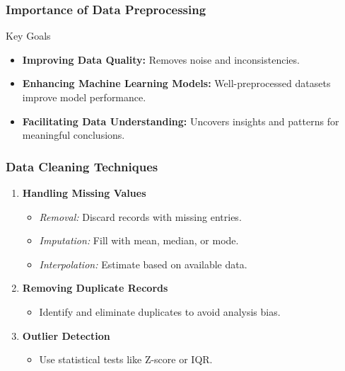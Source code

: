 \documentclass{beamer}
\begin{document}
\begin{frame}[fragile]
    \frametitle{Importance of Data Preprocessing}
    \begin{block}{Key Goals}
        \begin{itemize}
            \item \textbf{Improving Data Quality:} Removes noise and inconsistencies.
            \item \textbf{Enhancing Machine Learning Models:} Well-preprocessed datasets improve model performance.
            \item \textbf{Facilitating Data Understanding:} Uncovers insights and patterns for meaningful conclusions.
        \end{itemize}
    \end{block}
\end{frame}

\begin{frame}[fragile]
    \frametitle{Data Cleaning Techniques}
    \begin{enumerate}
        \item \textbf{Handling Missing Values}
            \begin{itemize}
                \item \textit{Removal:} Discard records with missing entries.
                \item \textit{Imputation:} Fill with mean, median, or mode.
                \item \textit{Interpolation:} Estimate based on available data.
            \end{itemize}
        \item \textbf{Removing Duplicate Records}
            \begin{itemize}
                \item Identify and eliminate duplicates to avoid analysis bias.
            \end{itemize}
        \item \textbf{Outlier Detection}
            \begin{itemize}
                \item Use statistical tests like Z-score or IQR.
            \end{itemize}
    \end{enumerate}
\end{frame}
\end{document}
